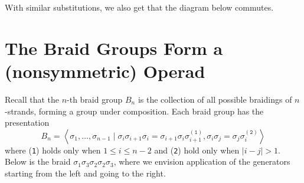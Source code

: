 With similar substitutions, we also get that the diagram below commutes. 
\begin{center}
\end{center}

\newpage
\section{The Braid Groups Form a (nonsymmetric) Operad}
Recall that the $n$-th braid group $B_n$ is the collection 
of all possible braidings of $n$-strands, forming a group under composition. 
Each braid group has the presentation 
\[
    B_n = \left< \sigma_1, \dots, \sigma_{n-1} \mid \sigma_i\sigma_{i+1}\sigma_{i} = \sigma_{i+1}\sigma_{i}\sigma_{i+1}^{(\texttt{1})}, \sigma_i\sigma_j = \sigma_j\sigma_i^{(\texttt{2})} \right>   
\]
where (\texttt{1}) holds only when $1 \le i \le n - 2$ and (\texttt{2}) hold only when 
$|i - j| > 1$. Below is the braid $\sigma_1 \sigma_3 \sigma_2 \sigma_2 \sigma_3$, 
where we envision application of the generators starting from the left and going to the right.
\begin{center}
\end{center}

